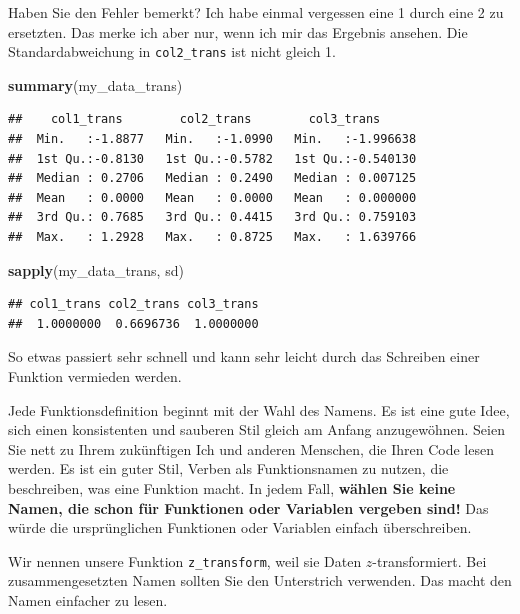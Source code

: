 \documentclass[]{book}
\newenvironment{Shaded}{\begin{snugshade}}{\end{snugshade}}
\newcommand{\KeywordTok}[1]{\textcolor[rgb]{0.13,0.29,0.53}{\textbf{#1}}}
\newcommand{\NormalTok}[1]{#1}
\begin{document}
Haben Sie den Fehler bemerkt? Ich habe einmal vergessen eine 1 durch eine 2 zu ersetzten. Das merke ich aber nur, wenn ich mir das Ergebnis ansehen. Die Standardabweichung in \texttt{col2\_trans} ist nicht gleich 1.

\begin{Shaded}
\begin{Highlighting}[]
\KeywordTok{summary}\NormalTok{(my_data_trans)}
\end{Highlighting}
\end{Shaded}

\begin{verbatim}
##    col1_trans        col2_trans        col3_trans       
##  Min.   :-1.8877   Min.   :-1.0990   Min.   :-1.996638  
##  1st Qu.:-0.8130   1st Qu.:-0.5782   1st Qu.:-0.540130  
##  Median : 0.2706   Median : 0.2490   Median : 0.007125  
##  Mean   : 0.0000   Mean   : 0.0000   Mean   : 0.000000  
##  3rd Qu.: 0.7685   3rd Qu.: 0.4415   3rd Qu.: 0.759103  
##  Max.   : 1.2928   Max.   : 0.8725   Max.   : 1.639766
\end{verbatim}

\begin{Shaded}
\begin{Highlighting}[]
\KeywordTok{sapply}\NormalTok{(my_data_trans, sd)}
\end{Highlighting}
\end{Shaded}

\begin{verbatim}
## col1_trans col2_trans col3_trans 
##  1.0000000  0.6696736  1.0000000
\end{verbatim}

So etwas passiert sehr schnell und kann sehr leicht durch das Schreiben einer Funktion vermieden werden.

Jede Funktionsdefinition beginnt mit der Wahl des Namens. Es ist eine gute Idee, sich einen konsistenten und sauberen Stil gleich am Anfang anzugewöhnen. Seien Sie nett zu Ihrem zukünftigen Ich und anderen Menschen, die Ihren Code lesen werden. Es ist ein guter Stil, Verben als Funktionsnamen zu nutzen, die beschreiben, was eine Funktion macht. In jedem Fall, \textbf{wählen Sie keine Namen, die schon für Funktionen oder Variablen vergeben sind!} Das würde die ursprünglichen Funktionen oder Variablen einfach überschreiben.

Wir nennen unsere Funktion \texttt{z\_transform}, weil sie Daten \(z\)-transformiert. Bei zusammengesetzten Namen sollten Sie den Unterstrich verwenden. Das macht den Namen einfacher zu lesen.
\end{document}
